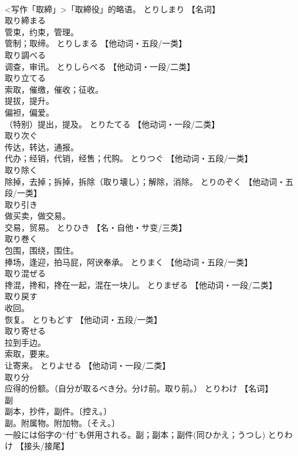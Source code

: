 \documentclass[8pt]{extreport}
\begin{document}
\begin{CJK}{UTF8}{min}
\\	<写作「取締」>「取締役」的略语。	とりしまり		【名词】
\\	取り締まる	
\\	管束，约束，管理。 
\\	管制；取缔。	とりしまる		【他动词・五段/一类】
\\	取り調べる	
\\	调查，审讯。	とりしらべる		【他动词・一段/二类】
\\	取り立てる	
\\	索取，催缴，催收；征收。 
\\	提拔，提升。 
\\	偏袒，偏爱。 
\\	（特别）提出，提及。	とりたてる		【他动词・一段/二类】
\\	取り次ぐ	
\\	传达，转达，通报。 
\\	代办；经销，代销，经售；代购。	とりつぐ		【他动词・五段/一类】
\\	取り除く	
\\	除掉，去掉；拆掉，拆除（取り壊し）；解除，消除。	とりのぞく		【他动词・五段/一类】
\\	取り引き	
\\	做买卖，做交易。 
\\	交易，贸易。	とりひき		【名・自他・サ变/三类】
\\	取り巻く	
\\	包围，围绕，围住。 
\\	捧场，逢迎，拍马屁，阿谀奉承。	とりまく		【他动词・五段/一类】
\\	取り混ぜる	
\\	搀混，搀和，搀在一起，混在一块儿。	とりまぜる		【他动词・一段/二类】
\\	取り戻す	
\\	收回。 
\\	恢复。	とりもどす		【他动词・五段/一类】
\\	取り寄せる	
\\	拉到手边。 
\\	索取，要来。 
\\	让寄来。	とりよせる		【他动词・一段/二类】
\\	取り分	
\\	应得的份额。（自分が取るべき分。分け前。取り前。）	とりわけ		【名词】
\\	副	
\\	副本，抄件，副件。〔控え。〕 
\\	副。附属物。附加物。〔そえ。〕 
\\	一般には俗字の“付”も併用される。副；副本；副件(同ひかえ；うつし)	とりわけ		【接头/接尾】

\end{CJK}
\end{document}
